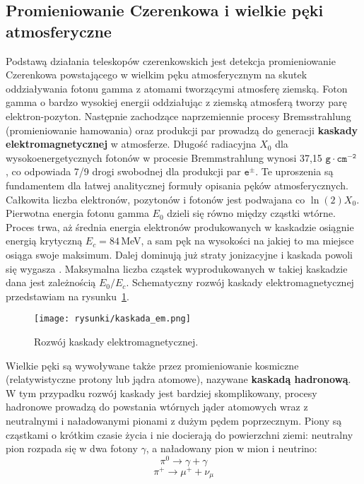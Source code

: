 \documentclass[a4paper,11pt,twoside]{article}
\begin{document}
\subsection{Promieniowanie Czerenkowa i wielkie pęki atmosferyczne}
Podstawą działania teleskopów czerenkowskich jest detekcja promieniowanie Czerenkowa powstającego w wielkim pęku atmosferycznym na skutek oddziaływania fotonu gamma z atomami tworzącymi atmosferę ziemską. 
Foton gamma o bardzo wysokiej energii oddziałując z ziemską atmosferą tworzy parę elektron-pozyton. Następnie zachodzące naprzemiennie procesy Bremsstrahlung (promieniowanie hamowania) oraz produkcji par prowadzą do generacji {\bf{kaskady elektromagnetycznej}} w atmosferze. Długość radiacyjna $X_0$ dla wysokoenergetycznych fotonów w procesie Bremmstrahlung wynosi 37,15 $\mathtt{g} \cdot \mathtt{cm^{-2}}$ \cite{IACT}, co odpowiada 7/9 drogi swobodnej dla produkcji par $\mathtt{e^{\pm}}$. Te uproszenia są fundamentem dla łatwej analitycznej formuły opisania pęków atmosferycznych. Całkowita liczba elektronów, pozytonów i fotonów jest podwajana co $\ln(2) X_0$. Pierwotna energia fotonu gamma $E_0$ dzieli się równo między cząstki wtórne. Proces trwa, aż średnia energia elektronów produkowanych w kaskadzie osiągnie energią krytyczną $E_c = 84$\,MeV, a sam pęk na wysokości na jakiej to ma miejsce osiąga swoje maksimum. Dalej   dominują już straty jonizacyjne i kaskada powoli się wygasza \cite{IACT}. Maksymalna liczba cząstek wyprodukowanych w takiej kaskadzie dana jest zależnością $E_0 / E_c$. Schematyczny rozwój kaskady elektromagnetycznej przedstawiam na rysunku~\ref{fig:cas_em}. 
\begin{figure}[H] 
\centering
\texttt{[image: rysunki/kaskada\_em.png]}
\caption{Rozwój kaskady elektromagnetycznej.}
\label{fig:cas_em}
\end{figure}
Wielkie pęki są wywoływane także przez promieniowanie kosmiczne (relatywistyczne protony lub jądra atomowe), nazywane {\bf{kaskadą hadronową}}. W tym przypadku rozwój kaskady jest bardziej skomplikowany, procesy hadronowe prowadzą do powstania wtórnych jąder atomowych wraz z neutralnymi i naładowanymi pionami z dużym pędem poprzecznym. Piony są cząstkami o krótkim czasie życia i nie docierają do powierzchni ziemi: neutralny pion rozpada się w dwa fotony $\gamma$, a naładowany pion w mion i neutrino:
\begin{equation*}
\pi^0 \rightarrow \gamma + \gamma 
\end{equation*}
\begin{equation*}
\pi^+ \rightarrow \mu^+ + \nu_{\mu}
\end{equation*}  
\end{document}
